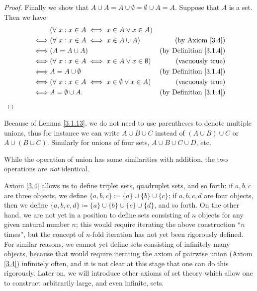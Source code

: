 \begin{proof}
    Finally we show that \(A \cup A = A \cup \emptyset = \emptyset \cup A = A\).
    Suppose that \(A\) is a set.
    Then we have
    \begin{align*}
             & (\forall\ x : x \in A \iff x \in A \lor x \in A)                                              \\
        \iff & (\forall\ x : x \in A \iff x \in A \cup A)               & \text{(by Axiom \ref{3.4})}        \\
        \iff & (A = A \cup A)                                           & \text{(by Definition \ref{3.1.4})} \\
        \iff & (\forall\ x : x \in A \iff x \in A \lor x \in \emptyset) & \text{(vacuously true)}            \\
        \iff & A = A \cup \emptyset                                     & \text{(by Definition \ref{3.1.4})} \\
        \iff & (\forall\ x : x \in A \iff x \in \emptyset \lor x \in A) & \text{(vacuously true)}            \\
        \iff & A = \emptyset \cup A.                                    & \text{(by Definition \ref{3.1.4})}
    \end{align*}
\end{proof}

\begin{note}
    Because of Lemma \ref{3.1.13}, we do not need to use parentheses to denote multiple unions, thus for instance we can write \(A \cup B \cup C\) instead of \((A \cup B) \cup C\) or \(A \cup (B \cup C)\).
    Similarly for unions of four sets, \(A \cup B \cup C \cup D\), etc.
\end{note}

\begin{remark}\label{3.1.14}
    While the operation of union has some similarities with addition, the two operations are \emph{not} identical.
\end{remark}

\begin{note}
    Axiom \ref{3.4} allows us to define triplet sets, quadruplet sets, and so forth: if \(a, b, c\) are three objects, we define \(\{a, b, c\} \coloneqq \{a\} \cup \{b\} \cup \{c\}\);
    if \(a, b, c, d\) are four objects, then we define \(\{a, b, c, d\} \coloneqq \{a\} \cup \{b\} \cup \{c\} \cup \{d\}\), and so forth.
    On the other hand, we are not yet in a position to define sets consisting of \(n\) objects for any given natural number \(n\);
    this would require iterating the above construction ``\(n\) times'', but the concept of \(n\)-fold iteration has not yet been rigorously defined.
    For similar reasons, we cannot yet define sets consisting of infinitely many objects, because that would require iterating the axiom of pairwise union (Axiom \ref{3.4}) infinitely often, and it is not clear at this stage that one can do this rigorously.
    Later on, we will introduce other axioms of set theory which allow one to construct arbitrarily large, and even infinite, sets.
\end{note}

